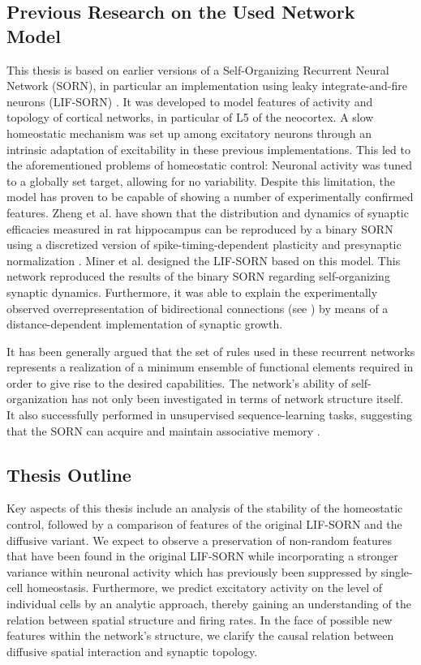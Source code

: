 \documentclass[10pt,a4paper]{article}
\begin{document}
\subsection{Previous Research on the Used Network Model}
This thesis is based on earlier versions of a Self-Organizing Recurrent Neural Network (SORN), in particular an implementation using leaky integrate-and-fire neurons (LIF-SORN) \cite{SORN_Paper}. It was developed to model features of activity and topology of cortical networks, in particular of L5 of the neocortex. A slow homeostatic mechanism was set up among excitatory neurons through an intrinsic adaptation of excitability in these previous implementations. This led to the aforementioned problems of homeostatic control: Neuronal activity was tuned to a globally set target, allowing for no variability. Despite this limitation, the model has proven to be capable of showing a number of experimentally confirmed features. Zheng et al. have shown that the distribution and dynamics of synaptic efficacies measured in rat hippocampus can be reproduced by a binary SORN using a discretized version of spike-timing-dependent plasticity and presynaptic normalization \cite{Pengsheng_2013}. Miner et al. designed the LIF-SORN based on this model. This network reproduced the results of the binary SORN regarding self-organizing synaptic dynamics. Furthermore, it was able to explain the experimentally observed overrepresentation of bidirectional connections (see \cite{Markram_Connections_1997,Song_Connectivity_2005}) by means of a distance-dependent implementation of synaptic growth.

It has been generally argued that the set of rules used in these recurrent networks represents a realization of a minimum ensemble of functional elements required in order to give rise to the desired capabilities. The network's ability of self-organization has not only been investigated in terms of network structure itself. It also successfully performed in unsupervised sequence-learning tasks, suggesting that the SORN can acquire and maintain associative memory \cite{Hartmann_2016}.  

\pagebreak
 
\subsection{Thesis Outline}
Key aspects of this thesis include an analysis of the stability of the homeostatic control, followed by a comparison of features of the original LIF-SORN and the diffusive variant. We expect to observe a preservation of non-random features that have been found in the original LIF-SORN while incorporating a stronger variance within neuronal activity which has previously been suppressed by single-cell homeostasis. Furthermore, we predict excitatory activity on the level of individual cells by an analytic approach, thereby gaining an understanding of the relation between spatial structure and firing rates. In the face of possible new features within the network's structure, we clarify the causal relation between diffusive spatial interaction and synaptic topology.
\end{document}
